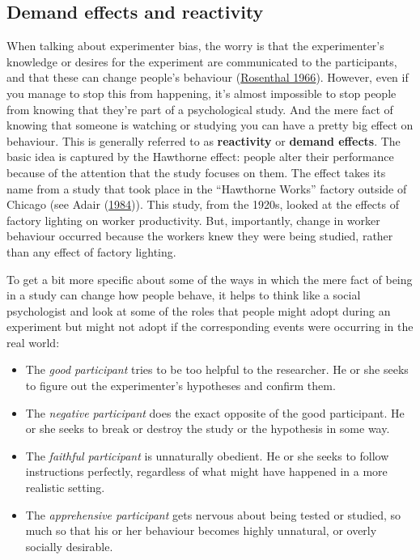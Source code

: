 \documentclass[
]{book}
\providecommand{\tightlist}{%
  \setlength{\itemsep}{0pt}\setlength{\parskip}{0pt}}
\begin{document}
\hypertarget{demand-effects-and-reactivity}{%
\subsection{Demand effects and reactivity}\label{demand-effects-and-reactivity}}

When talking about experimenter bias, the worry is that the experimenter's knowledge or desires for the experiment are communicated to the participants, and that these can change people's behaviour (\protect\hyperlink{ref-Rosenthal1966}{Rosenthal 1966}). However, even if you manage to stop this from happening, it's almost impossible to stop people from knowing that they're part of a psychological study. And the mere fact of knowing that someone is watching or studying you can have a pretty big effect on behaviour. This is generally referred to as \textbf{reactivity} or \textbf{demand effects}. The basic idea is captured by the Hawthorne effect: people alter their performance because of the attention that the study focuses on them. The effect takes its name from a study that took place in the ``Hawthorne Works'' factory outside of Chicago (see Adair (\protect\hyperlink{ref-Adair1984}{1984})). This study, from the 1920s, looked at the effects of factory lighting on worker productivity. But, importantly, change in worker behaviour occurred because the workers knew they were being studied, rather than any effect of factory lighting.

To get a bit more specific about some of the ways in which the mere fact of being in a study can change how people behave, it helps to think like a social psychologist and look at some of the roles that people might adopt during an experiment but might not adopt if the corresponding events were occurring in the real world:

\begin{itemize}
\tightlist
\item
  The \emph{good participant} tries to be too helpful to the researcher. He or she seeks to figure out the experimenter's hypotheses and confirm them.
\item
  The \emph{negative participant} does the exact opposite of the good participant. He or she seeks to break or destroy the study or the hypothesis in some way.
\item
  The \emph{faithful participant} is unnaturally obedient. He or she seeks to follow instructions perfectly, regardless of what might have happened in a more realistic setting.
\item
  The \emph{apprehensive participant} gets nervous about being tested or studied, so much so that his or her behaviour becomes highly unnatural, or overly socially desirable.
\end{itemize}
\end{document}

